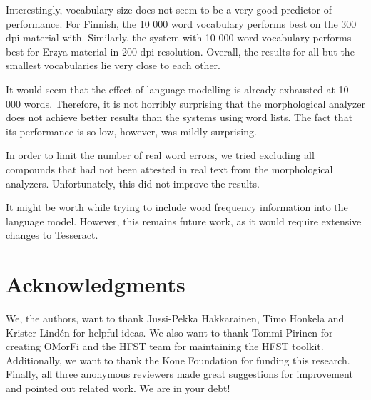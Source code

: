\documentclass[b5paper]{article}
\begin{document}
Interestingly, vocabulary size does not seem to be a very good
predictor of performance. For Finnish, the 10 000 word vocabulary
performs best on the 300 dpi material with. Similarly, the system with
10 000 word vocabulary performs best for Erzya material in 200 dpi
resolution. Overall, the results for all but the smallest vocabularies
lie very close to each other.

It would seem that the effect of language modelling is already
exhausted at 10 000 words. Therefore, it is not horribly surprising
that the morphological analyzer does not achieve better results than
the systems using word lists. The fact that its performance
is so low, however, was mildly surprising.

In order to limit the number of real word errors, we tried excluding
all compounds that had not been attested in real text from the
morphological analyzers. Unfortunately, this did not improve the
results.

It might be worth while trying to include word frequency information into
the language model. However, this remains future work, as it would
require extensive changes to Tesseract.

\section*{Acknowledgments}
We, the authors, want to thank Jussi-Pekka Hakkarainen, Timo Honkela
and Krister Lind\'{e}n for helpful ideas. We also want to thank Tommi
Pirinen for creating OMorFi and the HFST team for maintaining the HFST
toolkit. Additionally, we want to thank the Kone Foundation for
funding this research. Finally, all three anonymous reviewers made
great suggestions for improvement and pointed out related
work. We are in your debt!



\end{document}
